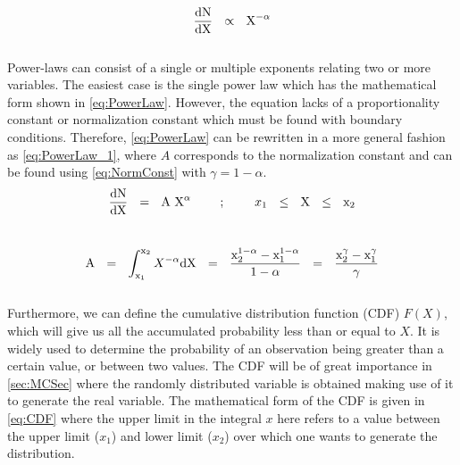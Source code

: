 \begingroup
\Large
\begin{equation}
 \frac{\textnormal{dN}}{\textnormal{dX}}~~\propto~~\textnormal{X}^{-\alpha}
 \label{eq:PowerLaw}
\end{equation}
\endgroup\\

Power-laws can consist of a single or multiple exponents relating two or more variables. The easiest case is the single power law which has the mathematical form shown in \autoref{eq:PowerLaw}. However, the equation lacks of a proportionality constant or normalization constant which must be found with boundary conditions. Therefore, \autoref{eq:PowerLaw} can be rewritten in a more general fashion as \autoref{eq:PowerLaw_1}, where $A$ corresponds to the normalization constant and can be found using \autoref{eq:NormConst} with $\gamma = 1 - \alpha$.\\

\begingroup
\Large
\begin{equation}
 \frac{\textnormal{dN}}{\textnormal{dX}}~~=~~\textnormal{A}~\textnormal{X}^\alpha~~~~~~~;~~~~~~~x_1 ~~\leq ~~\textnormal{X}~~ \leq ~~\textnormal{x}_2
 \label{eq:PowerLaw_1}
\end{equation}
\endgroup\\

\begingroup
\Large
\begin{equation}
 \textnormal{A}~~=~~\int_{\textnormal{x}_1}^{\textnormal{x}_2} X^{-\alpha} \textnormal{dX}~~=~~\frac{\textnormal{x}_2^{1 - \alpha} - \textnormal{x}_1^{1 - \alpha}}{1 - \alpha}~~=~~\frac{\textnormal{x}_2^{\gamma} - \textnormal{x}_1^{\gamma}}{\gamma} 
 \label{eq:NormConst}
\end{equation}
\endgroup\\

Furthermore, we can define the cumulative distribution function (CDF) $F(X)$, which will give us all the accumulated probability less than or equal to $X$. It is widely used to determine the probability of an observation being greater than a certain value, or between two values. The CDF will be of great importance in \autoref{sec:MCSec} where the randomly distributed variable is obtained making use of it to generate the real variable. The mathematical form of the CDF is given in \autoref{eq:CDF} where the upper limit in the integral $x$ here refers to a value between the upper limit ($x_1$) and lower limit ($x_2$) over which one wants to generate the distribution.\\ 


